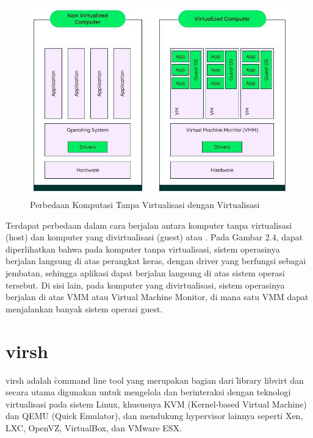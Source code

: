 \begin{figure}
	\centering
	\includegraphics[width=1\textwidth]
	{assets/pics/vm-diagram.jpg}
	\caption{Perbedaan Komputasi Tanpa Virtualisasi dengan Virtualisasi}
	\label{fig:vm-diagram}
\end{figure}

Terdapat perbedaan dalam cara berjalan antara komputer tanpa virtualisasi (host) dan komputer yang divirtualisasi (guest) atau \vm. Pada Gambar 2.4, dapat diperlihatkan bahwa pada komputer tanpa virtualisasi, sistem operasinya berjalan langsung di atas perangkat keras, dengan driver yang berfungsi sebagai jembatan, sehingga aplikasi dapat berjalan langsung di atas sistem operasi tersebut. Di sisi lain, pada komputer yang divirtualisasi, sistem operasinya berjalan di atas VMM atau Virtual Machine Monitor, di mana satu VMM dapat menjalankan banyak sistem operasi guest.

\section{virsh}

virsh adalah \f{command line tool} yang merupakan bagian dari \f{library} libvirt dan secara utama digunakan untuk mengelola dan berinteraksi dengan teknologi virtualisasi pada sistem Linux, khususnya KVM (Kernel-based Virtual Machine) dan QEMU (Quick Emulator), dan mendukung hypervisor lainnya seperti Xen, LXC, OpenVZ, VirtualBox, dan VMware ESX\cite{libvirtLibvirtVirsh}.

